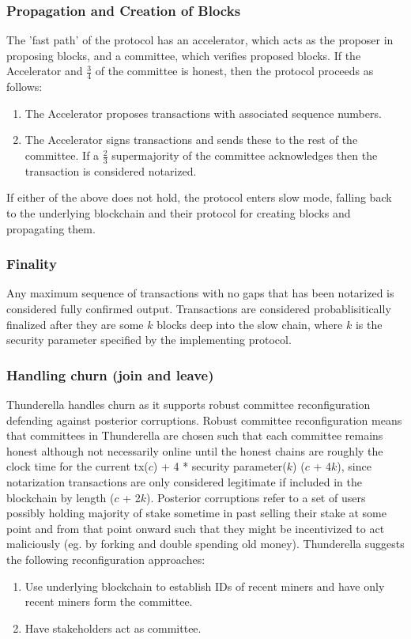 \documentclass[10pt,journal,compsoc]{IEEEtran}
\begin{document}
\subsubsection{Propagation and Creation of Blocks}
The 'fast path' of the protocol has an accelerator, which acts as the proposer in proposing blocks, and a committee, which verifies proposed blocks. If the Accelerator and \(\frac{3}{4}\)  of the committee is honest, then the protocol proceeds as follows:
\begin{enumerate}
    \item The Accelerator proposes transactions with associated sequence numbers. 
    \item The Accelerator signs transactions and sends these to the rest of the committee. If a \(\frac{2}{3}\) supermajority of the committee acknowledges then the transaction is considered notarized.
\end{enumerate}
If either of the above does not hold, the protocol enters slow mode, falling back to the underlying blockchain and their protocol for creating blocks and propagating them.

\subsubsection{Finality}
Any maximum sequence of transactions with no gaps that has been notarized is considered fully confirmed output. Transactions are considered probablisitically finalized after they are some $k$ blocks deep into the slow chain, where $k$ is the security parameter specified by the implementing protocol. 

\subsubsection{Handling churn (join and leave)}
Thunderella handles churn as it supports robust committee reconfiguration defending against posterior corruptions. Robust committee reconfiguration means that committees in Thunderella are chosen such that each committee remains honest although not necessarily online until the honest chains are roughly the clock time for the current tx($c$) + 4 * security parameter($k$) ($c$ + 4$k$), since notarization transactions are only considered legitimate if included in the blockchain by length ($c$ + 2$k$). Posterior corruptions refer to a set of users possibly holding majority of stake sometime in past selling their stake at some point and from that point onward such that they might be incentivized to act maliciously (eg. by forking and double spending old money). Thunderella suggests the following reconfiguration approaches: 
\begin{enumerate}
    \item Use underlying blockchain to establish IDs of recent miners and have only recent miners form the committee. 
    \item Have stakeholders act as committee.
\end{enumerate}
\end{document}
